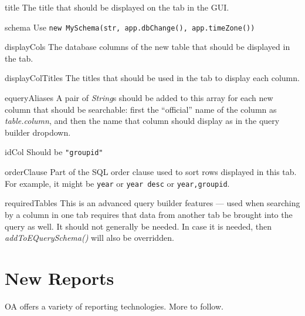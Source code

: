 \documentclass[11pt]{article}
\begin{document}
\begin{description}

\item{title} The title that should be displayed on the tab in the GUI.
\item{schema} Use {\tt new MySchema(str, app.dbChange(), app.timeZone())}
\item{displayCols} The database columns of the new table that should be displayed in the tab.
\item{displayColTitles} The titles that should be used in the tab to display each column.
 \item{equeryAliases} A pair of \emph{String}s should be added to this array for each new column that should be searchable: first the ``official'' name of the column as \emph{table.column}, and then the name that column should display as in the query builder dropdown.
 \item{idCol} Should be {\tt "groupid"}
 \item{orderClause} Part of the SQL order clause used to sort rows displayed in this tab.  For example, it might be {\tt year} or {\tt year desc} or {\tt year,groupid}.
 \item{requiredTables} This is an advanced query builder features --- used when searching by a column in one tab requires that data from another tab be brought into the query as well.  It should not generally be needed.  In case it is needed, then \emph{addToEQuerySchema()} will also be overridden.
\end{description}

\section{New Reports}

OA offers a variety of reporting technologies.  More to follow.
\end{document}
